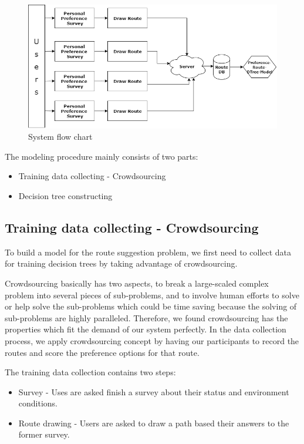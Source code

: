 \documentclass{sigchi}
\begin{document}
\begin{figure}[!h]
\centering
\includegraphics[width=2.0\columnwidth]{pics/work-flow.png}
\caption{System flow chart}
\label{fig:systemflow}
\end{figure}

The modeling procedure mainly consists of two parts:
\begin{itemize}
\item Training data collecting - Crowdsourcing
\item Decision tree constructing
\end{itemize}

\subsection{Training data collecting - Crowdsourcing}

To build a model for the route suggestion problem, we first need to collect data for training decision trees by taking advantage of crowdsourcing.


Crowdsourcing basically has two aspects, to break a large-scaled complex problem into several pieces of sub-problems, and to involve human efforts to solve or help solve the sub-problems which could be time saving because the solving of sub-problems are highly paralleled. Therefore, we found crowdsourcing has the properties which fit the demand of our system perfectly. In the data collection process, we apply crowdsourcing concept by having our participants to record the routes and score the preference options for that route.


The training data collection contains two steps:
\begin{itemize}
\item Survey - Uses are asked finish a survey about their status and environment conditions.
\item Route drawing - Users are asked to draw a path based their answers to the former survey.
\end{itemize}
\end{document}

